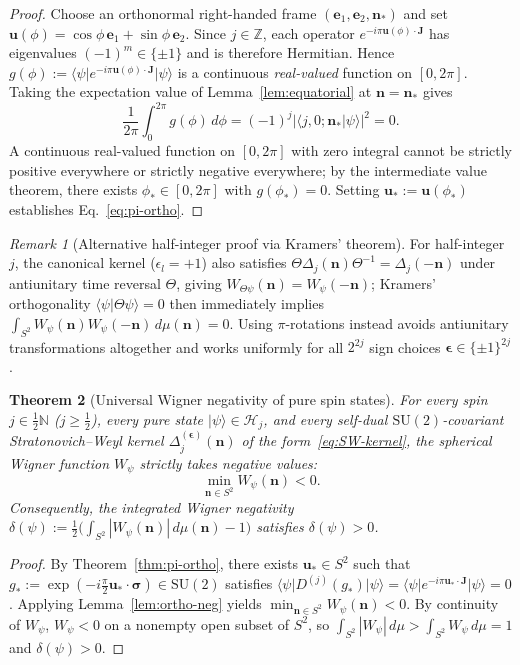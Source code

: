 \documentclass[11pt,a4paper]{article}
\newtheorem{theorem}{Theorem}
\theoremstyle{remark}
\newtheorem{remark}[theorem]{Remark}
\newcommand{\ket}[1]{\lvert #1 \rangle}
\newcommand{\bra}[1]{\langle #1 \rvert}
\newcommand{\braket}[2]{\langle #1 \vert #2 \rangle}
\newcommand{\bn}{\mathbf{n}}
\newcommand{\bu}{\mathbf{u}}
\newcommand{\bJ}{\mathbf{J}}
\newcommand{\be}{\mathbf{e}}
\begin{document}
\begin{proof}
Choose an orthonormal right-handed frame $(\be_1, \be_2, \bn_*)$ and set $\bu(\phi) = \cos\phi\,\be_1 + \sin\phi\,\be_2$. Since $j \in \mathbb{Z}$, each operator $e^{-i\pi \bu(\phi)\cdot\bJ}$ has eigenvalues $(-1)^m \in \{\pm 1\}$ and is therefore Hermitian. Hence $g(\phi) := \bra{\psi} e^{-i\pi \bu(\phi)\cdot\bJ} \ket{\psi}$ is a continuous \emph{real-valued} function on $[0, 2\pi]$. Taking the expectation value of Lemma~\ref{lem:equatorial} at $\bn = \bn_*$ gives
\[
\frac{1}{2\pi}\int_{0}^{2\pi} g(\phi)\,d\phi = (-1)^j \big|\braket{j,0;\bn_*}{\psi}\big|^2 = 0.
\]
A continuous real-valued function on $[0,2\pi]$ with zero integral cannot be strictly positive everywhere or strictly negative everywhere; by the intermediate value theorem, there exists $\phi_* \in [0,2\pi]$ with $g(\phi_*) = 0$. Setting $\bu_* := \bu(\phi_*)$ establishes Eq.~\eqref{eq:pi-ortho}.
\end{proof}

\begin{remark}[Alternative half-integer proof via Kramers' theorem]
For half-integer $j$, the canonical kernel ($\epsilon_l = +1$) also satisfies $\Theta \Delta_j(\bn)\Theta^{-1} = \Delta_j(-\bn)$ under antiunitary time reversal $\Theta$, giving $W_{\Theta\psi}(\bn) = W_\psi(-\bn)$; Kramers' orthogonality $\braket{\psi}{\Theta\psi} = 0$ then immediately implies $\int_{S^2} W_\psi(\bn)W_\psi(-\bn)\,d\mu(\bn) = 0$. Using $\pi$-rotations instead avoids antiunitary transformations altogether and works uniformly for all $2^{2j}$ sign choices $\boldsymbol{\epsilon} \in \{\pm 1\}^{2j}$.
\end{remark}

\begin{theorem}[Universal Wigner negativity of pure spin states]\label{thm:main}
For every spin $j \in \frac{1}{2}\mathbb{N}$ ($j \ge \frac{1}{2}$), every pure state $\ket{\psi} \in \mathcal{H}_j$, and every self-dual $\mathrm{SU}(2)$-covariant Stratonovich--Weyl kernel $\Delta_j^{(\boldsymbol{\epsilon})}(\bn)$ of the form~\eqref{eq:SW-kernel}, the spherical Wigner function $W_\psi$ strictly takes negative values:
\[
\min_{\bn \in S^2} W_\psi(\bn) < 0.
\]
Consequently, the integrated Wigner negativity $\delta(\psi) := \frac{1}{2}\big(\int_{S^2}|W_\psi(\bn)|\,d\mu(\bn) - 1\big)$ satisfies $\delta(\psi) > 0$.
\end{theorem}

\begin{proof}
By Theorem~\ref{thm:pi-ortho}, there exists $\bu_* \in S^2$ such that $g_* := \exp(-i\frac{\pi}{2}\bu_*\cdot\boldsymbol{\sigma}) \in \mathrm{SU}(2)$ satisfies $\bra{\psi} D^{(j)}(g_*)\ket{\psi} = \bra{\psi} e^{-i\pi \bu_*\cdot\bJ}\ket{\psi} = 0$. Applying Lemma~\ref{lem:ortho-neg} yields $\min_{\bn \in S^2} W_\psi(\bn) < 0$. By continuity of $W_\psi$, $W_\psi < 0$ on a nonempty open subset of $S^2$, so $\int_{S^2} |W_\psi|\,d\mu > \int_{S^2} W_\psi\,d\mu = 1$ and $\delta(\psi) > 0$.
\end{proof}
\end{document}
